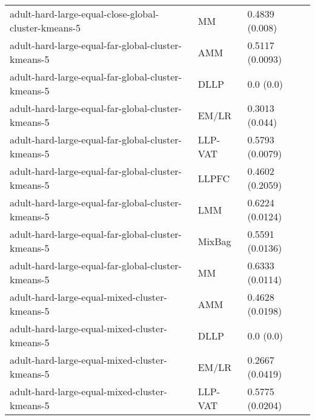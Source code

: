 \begin{longtable}{lll}
                                                         adult-hard-large-equal-close-global-cluster-kmeans-5 &        MM &                        0.4839 (0.008) \\
                                                           adult-hard-large-equal-far-global-cluster-kmeans-5 &       AMM &                       0.5117 (0.0093) \\
                                                           adult-hard-large-equal-far-global-cluster-kmeans-5 &      DLLP &                             0.0 (0.0) \\
                                                           adult-hard-large-equal-far-global-cluster-kmeans-5 &     EM/LR &                        0.3013 (0.044) \\
                                                           adult-hard-large-equal-far-global-cluster-kmeans-5 &   LLP-VAT &                       0.5793 (0.0079) \\
                                                           adult-hard-large-equal-far-global-cluster-kmeans-5 &     LLPFC &                       0.4602 (0.2059) \\
                                                           adult-hard-large-equal-far-global-cluster-kmeans-5 &       LMM &                       0.6224 (0.0124) \\
                                                           adult-hard-large-equal-far-global-cluster-kmeans-5 &    MixBag &                       0.5591 (0.0136) \\
                                                           adult-hard-large-equal-far-global-cluster-kmeans-5 &        MM &                       0.6333 (0.0114) \\
                                                                adult-hard-large-equal-mixed-cluster-kmeans-5 &       AMM &                       0.4628 (0.0198) \\
                                                                adult-hard-large-equal-mixed-cluster-kmeans-5 &      DLLP &                             0.0 (0.0) \\
                                                                adult-hard-large-equal-mixed-cluster-kmeans-5 &     EM/LR &                       0.2667 (0.0419) \\
                                                                adult-hard-large-equal-mixed-cluster-kmeans-5 &   LLP-VAT &                       0.5775 (0.0204) \\

\end{longtable}

